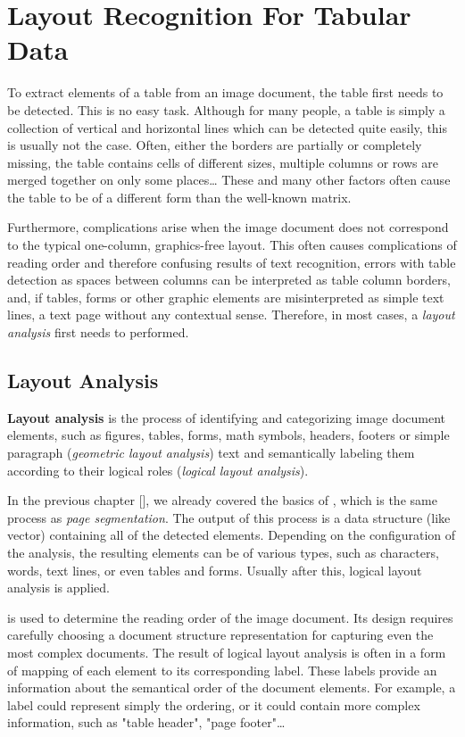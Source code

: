 \chapter{Layout Recognition For Tabular Data}

To extract elements of a table from an image document, the table first needs to be detected. This is no easy task.  Although for many people, a table is simply a collection of vertical and horizontal lines which can be detected quite easily, this is usually not the case. Often, either the borders are partially or completely missing, the table contains cells of different sizes, multiple columns or rows are merged together on only some places… These and many other factors often cause the table to be of a different form than the well-known matrix. 

Furthermore, complications arise when the image document does not correspond to the typical one-column, graphics-free layout. This often causes complications of reading order and therefore confusing results of text recognition, errors with table detection as spaces between columns can be interpreted as table column borders, and, if tables, forms or other graphic elements are misinterpreted as simple text lines, a text page without any contextual sense. Therefore, in most cases, a \emph{layout analysis} first needs to performed.

\section{Layout Analysis}

\textbf{Layout analysis} is the process of identifying and categorizing image document elements, such as figures, tables, forms, math symbols, headers, footers or simple paragraph (\emph{geometric layout analysis}) text and semantically labeling them according to their logical roles (\emph{logical layout analysis}).

In the previous chapter [], we already covered the basics of , which is the same process as \emph{page segmentation}. The output of this process is a data structure (like vector) containing all of the detected elements. Depending on the configuration of the analysis, the resulting elements can be of various types, such as characters, words, text lines, or even tables and forms. Usually after this, logical layout analysis is applied.

is used to determine the reading order of the image document. Its design requires carefully choosing a document structure representation for capturing even the most complex documents. The result of logical layout analysis is often in a form of mapping of each element to its corresponding label. These labels provide an information about the semantical order of the document elements. For example, a label could represent simply the ordering, or it could contain more complex information, such as "table header", "page footer"\ldots

